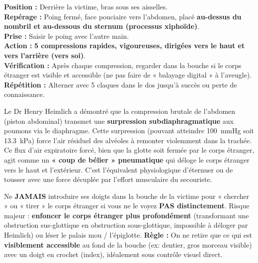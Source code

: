 \documentclass[11pt]{article}
\begin{document}
\begin{methode}
\textbf{Position :} Derrière la victime, bras sous ses aisselles.\\
\textbf{Repérage :} Poing fermé, face pouciaire vers l'abdomen, placé \textbf{au-dessus du nombril et au-dessous du sternum (processus xiphoïde)}.\\
\textbf{Prise :} Saisir le poing avec l'autre main.\\
\textbf{Action :} \textbf{5 compressions rapides, vigoureuses, dirigées vers le haut et vers l'arrière (vers soi)}.\\
\textbf{Vérification :} Après chaque compression, regarder dans la bouche si le corps étranger est visible et accessible (ne pas faire de « balayage digital » à l'aveugle).\\
\textbf{Répétition :} Alterner avec 5 claques dans le dos jusqu'à succès ou perte de connaissance.
\end{methode}

\begin{savaistu}
Le Dr Henry Heimlich a démontré que la compression brutale de l'abdomen (piston abdominal) transmet une \textbf{surpression subdiaphragmatique} aux poumons via le diaphragme. Cette surpression (pouvant atteindre \SI{100}{mmHg} soit \SI{13,3}{kPa}) force l'air résiduel des alvéoles à remonter violemment dans la trachée. Ce flux d'air expiratoire forcé, bien que la glotte soit fermée par le corps étranger, agit comme un \textbf{« coup de bélier » pneumatique} qui déloge le corps étranger vers le haut et l'extérieur. C'est l'équivalent physiologique d'éternuer ou de tousser avec une force décuplée par l'effort musculaire du secouriste.
\end{savaistu}

\begin{attention}
Ne \textbf{JAMAIS} introduire ses doigts dans la bouche de la victime pour « chercher » ou « tirer » le corps étranger si vous ne le voyez \textbf{PAS distinctement}. Risque majeur : \textbf{enfoncer le corps étranger plus profondément} (transformant une obstruction sus-glottique en obstruction sous-glottique, impossible à déloger par Heimlich) ou léser le palais mou / l'épiglotte. \textbf{Règle :} On ne retire que ce qui est \textbf{visiblement accessible} au fond de la bouche (ex: dentier, gros morceau visible) avec un doigt en crochet (index), idéalement sous contrôle visuel direct.
\end{attention}
\end{document}
